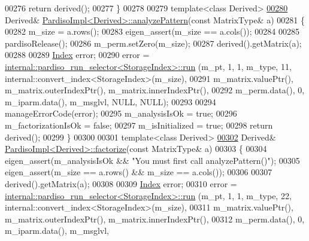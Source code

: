 \begin{DoxyCode}
00276   \textcolor{keywordflow}{return} derived();
00277 \}
00278 
00279 \textcolor{keyword}{template}<\textcolor{keyword}{class} Derived>
\hyperlink{class_eigen_1_1_pardiso_impl_af1773ce06014b55a69cd42daf34eeec4}{00280} Derived& \hyperlink{class_eigen_1_1_pardiso_impl_af1773ce06014b55a69cd42daf34eeec4}{PardisoImpl<Derived>::analyzePattern}(\textcolor{keyword}{const} MatrixType& a)
00281 \{
00282   m\_size = a.rows();
00283   eigen\_assert(m\_size == a.cols());
00284 
00285   pardisoRelease();
00286   m\_perm.setZero(m\_size);
00287   derived().getMatrix(a);
00288   
00289   \hyperlink{namespace_eigen_a62e77e0933482dafde8fe197d9a2cfde}{Index} error;
00290   error = \hyperlink{struct_eigen_1_1internal_1_1pardiso__run__selector}{internal::pardiso\_run\_selector<StorageIndex>::run}
      (m\_pt, 1, 1, m\_type, 11, internal::convert\_index<StorageIndex>(m\_size),
00291                                                             m\_matrix.valuePtr(), m\_matrix.outerIndexPtr(), 
      m\_matrix.innerIndexPtr(),
00292                                                             m\_perm.data(), 0, m\_iparm.data(), m\_msglvl, 
      NULL, NULL);
00293   
00294   manageErrorCode(error);
00295   m\_analysisIsOk = \textcolor{keyword}{true};
00296   m\_factorizationIsOk = \textcolor{keyword}{false};
00297   m\_isInitialized = \textcolor{keyword}{true};
00298   \textcolor{keywordflow}{return} derived();
00299 \}
00300 
00301 \textcolor{keyword}{template}<\textcolor{keyword}{class} Derived>
\hyperlink{class_eigen_1_1_pardiso_impl_a6a4c092c5fb581a946d3c4e5ec347dfb}{00302} Derived& \hyperlink{class_eigen_1_1_pardiso_impl_a6a4c092c5fb581a946d3c4e5ec347dfb}{PardisoImpl<Derived>::factorize}(\textcolor{keyword}{const} MatrixType& a)
00303 \{
00304   eigen\_assert(m\_analysisIsOk && \textcolor{stringliteral}{"You must first call analyzePattern()"});
00305   eigen\_assert(m\_size == a.rows() && m\_size == a.cols());
00306   
00307   derived().getMatrix(a);
00308 
00309   \hyperlink{namespace_eigen_a62e77e0933482dafde8fe197d9a2cfde}{Index} error;
00310   error = \hyperlink{struct_eigen_1_1internal_1_1pardiso__run__selector}{internal::pardiso\_run\_selector<StorageIndex>::run}
      (m\_pt, 1, 1, m\_type, 22, internal::convert\_index<StorageIndex>(m\_size),
00311                                                             m\_matrix.valuePtr(), m\_matrix.outerIndexPtr(), 
      m\_matrix.innerIndexPtr(),
00312                                                             m\_perm.data(), 0, m\_iparm.data(), m\_msglvl, 

\end{DoxyCode}
